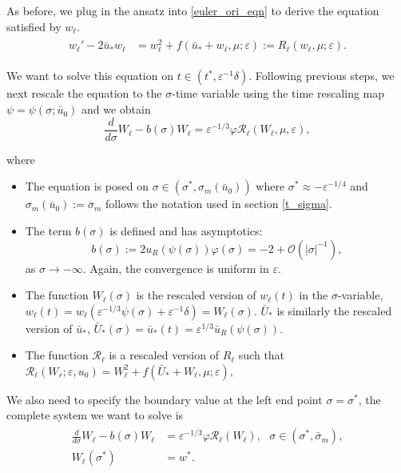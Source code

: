 \documentclass[letterpaper,11pt]{article}
\newcommand{\Ral}{\mathcal{R}}
\newcommand{\rmO}{\mathcal{O}}
\newcommand{\eps}{\varepsilon}
\numberwithin{equation}{section}
\theoremstyle{plain}
\begin{document}
As before, we plug in the ansatz into \eqref{euler_ori_eqn} to derive the equation satisfied by $w_\ell$.
\begin{align}\label{Eqn_wl}
\begin{split}
w_{\ell}' -2\bar{u}_* w_\ell &= w_\ell^2 + f(\bar{u}_*+w_\ell, \mu; \eps):=R_\ell(w_\ell,\mu;\eps).
\end{split}
\end{align}

We want to solve this equation on $t\in (t^*, \eps^{-1}\delta)$. 
Following previous steps, we next rescale the equation to the $\sigma$-time variable using the time rescaling map $\psi = \psi(\sigma; \bar{u}_0)$ and we obtain
\begin{equation}\label{rescl_wl}
\frac{d}{d\sigma} W_\ell - b(\sigma)W_\ell = \eps^{-1/3}\varphi \Ral_\ell(W_\ell,\mu,\eps),
\end{equation}

where 
\begin{itemize}
\item The equation is posed on $\sigma \in (\sigma^*, \sigma_m(\bar{u}_0))$ where $\sigma^* \approx -\eps^{-1/4}$ and $\sigma_m(\bar{u}_0) := \bar{\sigma}_m$ follows the notation used in section \ref{t_sigma}.

\item The term $b(\sigma)$ is defined and has asymptotics:
\[
b(\sigma) := 2u_R(\psi(\sigma))\varphi(\sigma) = -2 + \rmO(|\sigma|^{-1}),
\]
as $\sigma \to -\infty$. Again, the convergence is uniform in $\eps$.

\item The function $W_\ell(\sigma)$ is the rescaled version of $w_\ell(t)$ in the $\sigma$-variable, $w_\ell(t) = w_\ell(\eps^{-1/3}\psi(\sigma)+\eps^{-1}\delta) = W_\ell(\sigma)$. $\bar{U}_*$ is similarly the rescaled version of $\bar{u}_*$,  $\bar{U}_*(\sigma)= \bar{u}_*(t) = \eps^{1/3}\bar{u}_R(\psi(\sigma ) )$.

\item The function $\Ral_\ell$ is a rescaled version of $R_\ell$ such that $\Ral_\ell(W_r;\eps,u_0) = W_\ell^2 + f(\bar{U}_*+W_\ell, \mu;\eps),$ 
\end{itemize}

We also need to specify the boundary value at the left end point $\sigma = \sigma^*$, the complete system we want to solve is
\begin{align}\label{wl_bp}
\begin{split}
\frac{d}{d\sigma} W_\ell - b(\sigma)W_\ell &= \eps^{-1/3}\varphi \Ral_\ell(W_\ell), \text{ }\sigma \in (\sigma^*, \bar{\sigma}_m),\\
W_\ell(\sigma^*) &= w^*.
\end{split}
\end{align}
\end{document}
